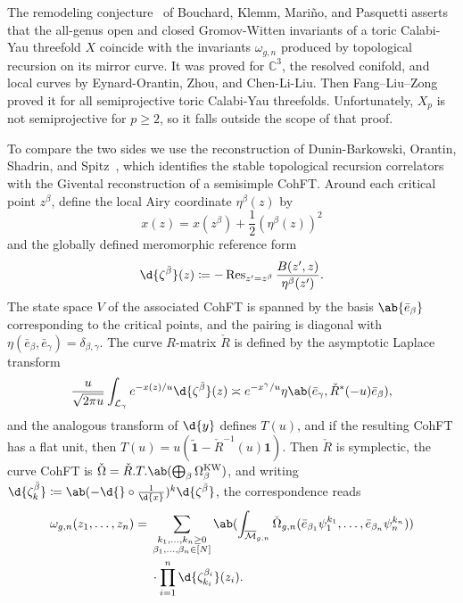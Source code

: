 \documentclass{amsart}
\theoremstyle{definition}
\theoremstyle{remark}
\theoremstyle{plain}
\theoremstyle{definition}
\theoremstyle{remark}
\newcommand{\C}{\mathbb{C}}
\newcommand{\Mbar}{\overline{\mathcal{M}}}
\newcommand{\mc}[1]{\mathcal{#1}}
\newcommand{\mr}[1]{\mathrm{#1}}
\newcommand{\on}[1]{\operatorname{#1}}
\newcommand{\wt}[1]{\widetilde{#1}}
\newcommand{\1}{\mathbf{1}}
\newcommand{\2}{\mathbf{2}}
\newcommand{\3}{\mathbf{3}}
\begin{document}
The remodeling conjecture~\cite{BKMP2009} of Bouchard, Klemm, Mari\~{n}o, and Pasquetti asserts that the all-genus open and closed Gromov-Witten invariants of a toric Calabi-Yau threefold \(X\) coincide with the invariants \(\omega_{g,n}\) produced by topological recursion on its mirror curve. It was proved for \(\C^3\), the resolved conifold, and local curves by Eynard-Orantin, Zhou, and Chen-Li-Liu. Then Fang--Liu--Zong~\cite{FLZ2020} proved it for all semiprojective toric Calabi-Yau threefolds. Unfortunately, \(X_p\) is not semiprojective for \(p \geq 2\), so it falls outside the scope of that proof.

To compare the two sides we use the reconstruction of Dunin-Barkowski, Orantin, Shadrin, and Spitz~\cite{DOSS2014}, which identifies the stable topological recursion correlators with the Givental reconstruction of a semisimple CohFT. Around each critical point \(z^{\beta}\), define the local Airy coordinate \(\eta^{\beta}(z)\) by
\[ x(z) = x(z^{\beta}) + \frac{1}{2}(\eta^{\beta}(z))^2 \]
and the globally defined meromorphic reference form
\[ \d{\zeta^{\bar{\beta}}}(z) \coloneqq -\on{Res}_{z'=z^{\beta}}\frac{B(z',z)}{\eta^{\beta}(z')}. \]
The state space \(V\) of the associated CohFT is spanned by the basis \(\ab\{\bar{e}_{\beta}\}\) corresponding to the critical points, and the pairing is diagonal with \(\eta(\bar{e}_{\beta},\bar{e}_{\gamma}) = \delta_{\beta,\gamma}\). The curve \(R\)-matrix \(\check{R}\) is defined by the asymptotic Laplace transform
\[ \frac{u}{\sqrt{2\pi u}}\int_{\mc{L}_{\gamma}} e^{-x(z)/u}\d{\zeta^{\bar{\beta}}}(z) \asymp e^{-x^{\gamma}/u}\eta\ab(\bar{e}_{\gamma}, \check{R}^*(-u)\bar{e}_{\beta}), \]
and the analogous transform of \(\d{y}\) defines \(T(u)\), and if the resulting CohFT has a flat unit, then \(T(u) = u(\wt{\1}-\check{R}^{-1}(u)\1)\). Then \(\check{R}\) is symplectic, the curve CohFT is \(\check{\Omega} = \check{R}.T.\ab(\bigoplus_{\beta}\Omega^{\mr{KW}}_{\beta})\), and writing \(\d{\zeta^{\bar{\beta}}_k} \coloneqq \ab(-\d{} \circ \frac{1}{\d{x}})^k \d{\zeta^{\bar{\beta}}}\), the correspondence reads
\begin{align*}
    \omega_{g,n}(z_1,\ldots,z_n) ={}& \sum_{\substack{k_1,\ldots,k_n \geq 0 \\ \beta_1,\ldots,\beta_n \in [N]}}\ab(\int_{\Mbar_{g,n}} \check{\Omega}_{g,n}(\bar{e}_{\beta_1}\psi_1^{k_1},\ldots,\bar{e}_{\beta_n}\psi_n^{k_n})) \\
    &\cdot \prod_{i=1}^n \d{\zeta^{\beta_i}_{k_i}}(z_i).
\end{align*}
\end{document}
